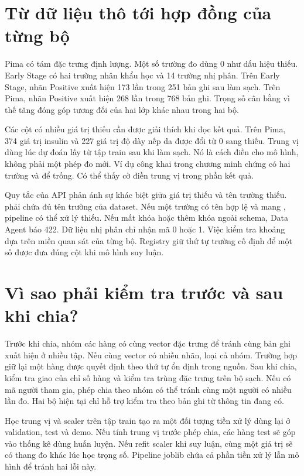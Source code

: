 \section{Từ dữ liệu thô tới hợp đồng của từng bộ}
Pima có tám đặc trưng định lượng. Một số trường đo dùng 0 như dấu hiệu thiếu. Early Stage có hai trường nhân khẩu học và 14 trường nhị phân. Trên Early Stage, nhãn Positive xuất hiện 173 lần trong 251 bản ghi sau làm sạch. Trên Pima, nhãn Positive xuất hiện 268 lần trong 768 bản ghi. Trọng số cân bằng vì thế tăng đóng góp tương đối của hai lớp khác nhau trong hai bộ.




Các cột có nhiều giá trị thiếu cần được giải thích khi đọc kết quả. Trên Pima, 374 giá trị insulin và 227 giá trị độ dày nếp da được đổi từ 0 sang thiếu. Trung vị dùng lúc dự đoán lấy từ tập train sau khi làm sạch. Nó là cách điền cho mô hình, không phải một phép đo mới. Ví dụ công khai trong chương minh chứng có hai trường  và  để trống. Có thể thấy cờ điền trung vị trong phần kết quả.

Quy tắc của API phản ánh sự khác biệt giữa giá trị thiếu và tên trường thiếu.  phải chứa đủ tên trường của dataset. Nếu một trường có tên hợp lệ và mang , pipeline có thể xử lý thiếu. Nếu mất khóa hoặc thêm khóa ngoài schema, Data Agent báo 422. Dữ liệu nhị phân chỉ nhận mã 0 hoặc 1. Việc kiểm tra khoảng dựa trên miền quan sát của từng bộ. Registry giữ thứ tự trường cố định để một số được đưa đúng cột khi mô hình suy luận.



\section{Vì sao phải kiểm tra trước và sau khi chia?}
Trước khi chia, nhóm các hàng có cùng vector đặc trưng để tránh cùng bản ghi xuất hiện ở nhiều tập. Nếu cùng vector có nhiều nhãn, loại cả nhóm. Trường hợp giữ lại một hàng được quyết định theo thứ tự ổn định trong nguồn. Sau khi chia, kiểm tra giao của chỉ số hàng và kiểm tra trùng đặc trưng trên bộ sạch. Nếu có mã người tham gia, phép chia theo nhóm có thể tránh cùng một người có nhiều lần đo. Hai bộ hiện tại chỉ hỗ trợ kiểm tra theo bản ghi từ thông tin đang có.

Học trung vị và scaler trên tập train tạo ra một đối tượng tiền xử lý dùng lại ở validation, test và demo. Nếu tính trung vị trước phép chia, các hàng test sẽ góp vào thống kê dùng huấn luyện. Nếu refit scaler khi suy luận, cùng một giá trị sẽ có thang đo khác lúc học trọng số. Pipeline joblib chứa cả phần tiền xử lý lẫn mô hình để tránh hai lỗi này.

